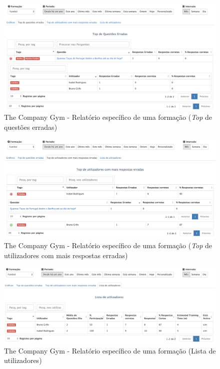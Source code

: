 \begin{figure}[ht!]
	\begin{center}
		\includegraphics[width=1\textwidth]{img/tcg/tcg-data-f1.png}
		\caption{The Company Gym - Relatório específico de uma formação (\textit{Top} de questões erradas)}
		\label{fig:tcg-data-f1}
	\end{center}
\end{figure}
\mbox{}
\begin{figure}[ht!]
	\begin{center}
		\includegraphics[width=1\textwidth]{img/tcg/tcg-data-f2.png}
		\caption{The Company Gym - Relatório específico de uma formação (\textit{Top} de utilizadores com mais respostas erradas)}
		\label{fig:tcg-data-f2}
	\end{center}
\end{figure}

\begin{figure}[ht!]
	\begin{center}
		\includegraphics[width=1\textwidth]{img/tcg/tcg-data-f3.png}
		\caption{The Company Gym - Relatório específico de uma formação (Lista de utilizadores)}
		\label{fig:tcg-data-f3}
	\end{center}
\end{figure}



